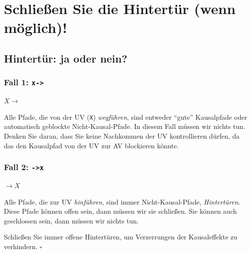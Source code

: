 \documentclass[
  ngerman,
  letterpaper,
  twoside,
  open=any]{scrbook}
\theoremstyle{definition}
\theoremstyle{plain}
\theoremstyle{definition}
\theoremstyle{definition}
\theoremstyle{definition}
\theoremstyle{definition}
\theoremstyle{remark}
\begin{document}
\section{Schließen Sie die Hintertür (wenn
möglich)!}\label{schlieuxdfen-sie-die-hintertuxfcr-wenn-muxf6glich}

\subsection{Hintertür: ja oder nein?}\label{hintertuxfcr-ja-oder-nein}

\subsubsection{\texorpdfstring{Fall 1:
\texttt{x-\textgreater{}}}{Fall 1: x-\textgreater{}}}\label{fall-1-x-}

\(\boxed{X \rightarrow}\)

Alle Pfade, die von der UV (\texttt{X}) \emph{wegführen}, sind entweder
\enquote{gute} Kausalpfade oder automatisch geblockte
Nicht-Kausal-Pfade. In diesem Fall müssen wir nichts tun. Denken Sie
daran, dass Sie keine Nachkommen der UV kontrollieren dürfen, da das den
Kausalpfad von der UV zur AV blockieren könnte.

\subsubsection{\texorpdfstring{Fall 2:
\texttt{-\textgreater{}x}}{Fall 2: -\textgreater x}}\label{fall-2--x}

\(\boxed{\rightarrow X}\)

Alle Pfade, die zur UV \emph{hinführen}, sind immer Nicht-Kausal-Pfade,
\emph{Hintertüren}. Diese Pfade können offen sein, dann müssen wir sie
schließen. Sie können auch geschlossen sein, dann müssen wir nichts tun.

\begin{tcolorbox}[enhanced jigsaw, arc=.35mm, bottomrule=.15mm, bottomtitle=1mm, breakable, colback=white, colbacktitle=quarto-callout-tip-color!10!white, colframe=quarto-callout-tip-color-frame, coltitle=black, left=2mm, leftrule=.75mm, opacityback=0, opacitybacktitle=0.6, rightrule=.15mm, title=\textcolor{quarto-callout-tip-color}{\faLightbulb}\hspace{0.5em}{Tipp}, titlerule=0mm, toprule=.15mm, toptitle=1mm]

Schließen Sie immer offene Hintertüren, um Verzerrungen der
Kausaleffekte zu verhindern. \(\square\)

\end{tcolorbox}
\end{document}
